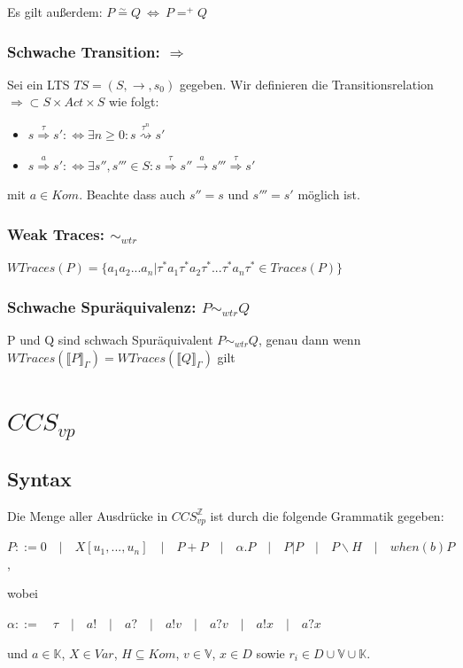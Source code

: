 \documentclass[a4paper,10pt, oneside]{book}
\begin{document}
Es gilt außerdem: $P \overset{\sim}{=} Q \: \Leftrightarrow \: P =^+ Q$

\subsubsection*{Schwache Transition: $\Longrightarrow$}
Sei ein LTS $TS = (S,\rightarrow,s_0)$ gegeben. Wir definieren die Transitionsrelation $\Longrightarrow \subset S \times Act \times S$ wie folgt:
\begin{itemize}
 \item $s \overset{\tau}{\Longrightarrow} s': \Leftrightarrow \exists n \geq 0: s \overset{\tau^n}{\rightsquigarrow} s'$
 \item $s \overset{a}{\Longrightarrow} s': \Leftrightarrow \exists s'',s''' \in S: s \overset{\tau}{\Rightarrow} s'' \xrightarrow{a} s''' \overset{\tau}{\Rightarrow} s'$
\end{itemize}
mit $a \in Kom$. Beachte dass auch $s'' = s$ und $s''' = s'$ möglich ist.


\subsubsection*{Weak Traces: $\sim_{wtr}$}
$WTraces(P) = \{a_1 a_2 ... a_n | \tau^* a_1 \tau^* a_2 \tau^* ... \tau^* a_n \tau^* \in Traces(P)\}$


\subsubsection{Schwache Spuräquivalenz: $P \sim_{wtr} Q$}
P und Q sind schwach Spuräquivalent $P \sim_{wtr} Q$, genau dann wenn $WTraces(\llbracket P \rrbracket_{\Gamma}) = WTraces(\llbracket Q \rrbracket_{\Gamma})$ gilt 

\section{$CCS_{vp}$}
\subsection*{Syntax}
Die Menge aller Ausdrücke in $CCS_{vp}^{\mathds{Z}}$ ist durch die folgende Grammatik gegeben:
\begin{center}
 $P ::= 0 \quad | \quad X[u_1,...,u_n] \quad | \quad P + P \quad | \quad \alpha.P \quad | \quad P | P \quad | \quad P\backslash H \quad | \quad when(b) P$,
\end{center}
wobei
\begin{center}
 $\alpha ::= \quad \tau \quad | \quad a! \quad | \quad a? \quad | \quad a!v \quad | \quad a?v \quad | \quad a!x \quad | \quad a?x$
\end{center}
und $a \in \mathds{K}$, $X \in Var$, $H \subseteq Kom$, $v \in \mathds{V}$, $x \in D$ sowie $r_i \in D \cup \mathds{V} \cup \mathds{K}$.
\end{document}
